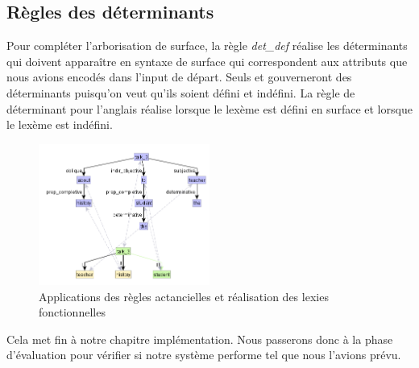 \subsection{Règles des déterminants}
Pour compléter l'arborisation de surface, la règle \emph{det\_def} réalise les déterminants qui doivent apparaître en syntaxe de surface qui correspondent aux attributs que nous avions encodés dans l'input de départ. Seuls  et  gouverneront des déterminants puisqu'on veut qu'ils soient défini et indéfini. La règle de déterminant pour l'anglais réalise  lorsque le lexème est défini en surface et  lorsque le lexème est indéfini.
\begin{figure}[htb]
	\centering
	\includegraphics[width=0.5\textwidth, trim = {0cm 0cm 0cm 0cm},clip]{ch6/figs/ssynt.png}
	\caption{Applications des règles actancielles et réalisation des lexies fonctionnelles}
	\label{deroulement4}
\end{figure}
Cela met fin à notre chapitre implémentation. Nous passerons donc à la phase d'évaluation pour vérifier si notre système performe tel que nous l'avions prévu.